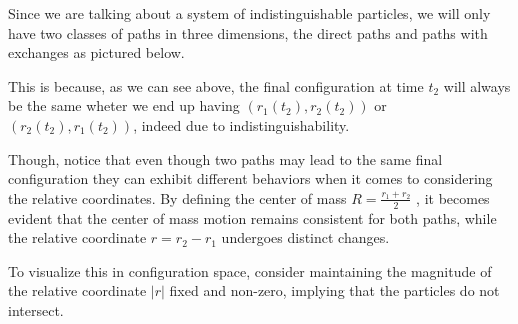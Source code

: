 \documentclass[12pt]{report}
\begin{document}
\begin{minipage}{1 \textwidth}
		Since we are talking about a system of indistinguishable particles, we will only have two classes of paths in three dimensions, the direct paths and paths with exchanges as pictured below.\newline
		
		
	    This is because, as we can see above, the final configuration at time $t_2$ will always be the same wheter we end up having $(r_1(t_2),r_2(t_2))$ or $(r_2(t_2),r_1(t_2))$, indeed due to indistinguishability.\newline
		
		Though, notice that even though two paths may lead to the same final configuration they can exhibit different behaviors when it comes to considering the relative coordinates. By defining the center of mass $R= \frac{r_1+r_2}{2}$ , it becomes evident that the center of mass motion remains consistent for both paths, while the relative coordinate $r=r_2-r_1$ undergoes distinct changes.\newline
		
		To visualize this in configuration space, consider maintaining the magnitude of the relative coordinate $|r|$ fixed and non-zero, implying that the particles do not intersect. \newline 
		
	
		
	\end{minipage}
	
\end{document}
